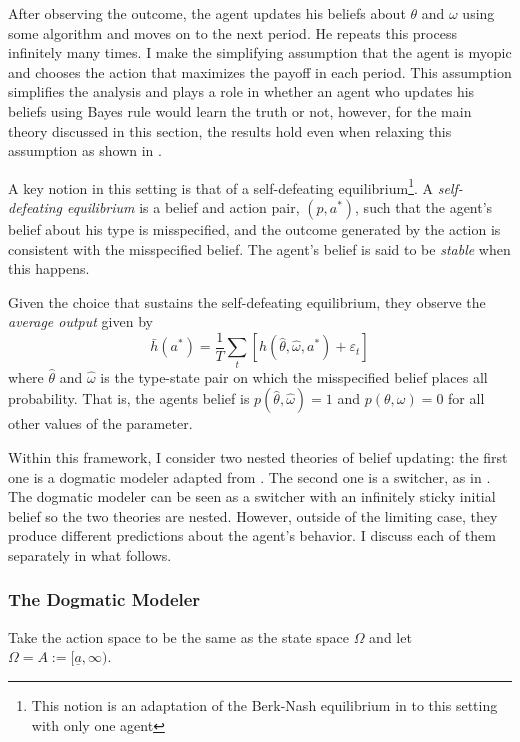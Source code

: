 \documentclass[
  12pt,
]{article}
\begin{document}
After observing the outcome, the agent updates his beliefs about
\(\theta\) and \(\omega\) using some algorithm and moves on to the next
period. He repeats this process infinitely many times. I make the
simplifying assumption that the agent is myopic and chooses the action
that maximizes the payoff in each period. This assumption simplifies the
analysis and plays a role in whether an agent who updates his beliefs
using Bayes rule would learn the truth or not, however, for the main
theory discussed in this section, the results hold even when relaxing
this assumption as shown in \citet{Heidhues2018}.

A key notion in this setting is that of a self-defeating
equilibrium\footnote{This notion is an adaptation of the Berk-Nash equilibrium in \citet{Esponda2016} to this setting with only one agent}.
A \emph{self-defeating equilibrium} is a belief and action pair,
\((p, a^*)\), such that the agent's belief about his type is
misspecified, and the outcome generated by the action is consistent with
the misspecified belief. The agent's belief is said to be \emph{stable}
when this happens.

Given the choice that sustains the self-defeating equilibrium, they
observe the \emph{average output} given by
\[\bar{h}(a^*) =\frac{1}{T}\sum_t \left[h(\hat{\theta}, \hat{\omega}, a^*)+\varepsilon_t\right]\]
where \(\hat{\theta}\) and \(\hat{\omega}\) is the type-state pair on
which the misspecified belief places all probability. That is, the
agents belief is \(p(\hat{\theta}, \hat{\omega}) = 1\) and
\(p(\theta, \omega) = 0\) for all other values of the parameter.

Within this framework, I consider two nested theories of belief
updating: the first one is a dogmatic modeler adapted from
\citet{Heidhues2018}. The second one is a switcher, as in
\citet{Ba2023}. The dogmatic modeler can be seen as a switcher with an
infinitely sticky initial belief so the two theories are nested.
However, outside of the limiting case, they produce different
predictions about the agent's behavior. I discuss each of them
separately in what follows.

\hypertarget{the-dogmatic-modeler}{%
\subsubsection{The Dogmatic Modeler}\label{the-dogmatic-modeler}}

Take the action space to be the same as the state space \(\Omega\) and
let \(\Omega=A:=[\underline{a}, \infty)\).
\end{document}
